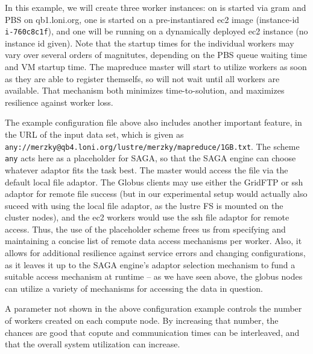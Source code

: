 \documentclass[conference,final]{IEEEtran}
\newcommand{\T}[1]{\texttt{#1}}
\begin{document}
  
  
  

 In this example, we will create three worker instances: on is started
 via gram and PBS on qb1.loni.org, one is started on a
 pre-instantiared ec2 image (instance-id \T{i-760c8c1f}), and one will
 be running on a dynamically deployed ec2 instance (no instance id
 given).  Note that the startup times for the individual workers may
 vary over several orders of magnitutes, depending on the PBS queue
 waiting time and VM startup time.  The mapreduce master will start to
 utilize workers as soon as they are able to register themselfs, so
 will not wait until all workers are available.  That mechanism both
 minimizes time-to-solution, and maximizes resilience against worker
 loss.

 The example configuration file above also includes another important
 feature, in the URL of the input data set, which is given as
 {\footnotesize
   \T{any://merzky@qb4.loni.org/lustre/merzky/mapreduce/1GB.txt}}.
 The scheme \T{any} acts here as a placeholder for SAGA, so that the
 SAGA engine can choose whatever adaptor fits the task best.  The
 master would access the file via the default local file adaptor.  The
 Globus clients may use either the GridFTP or ssh adaptor for remote
 file success (but in our experimental setup would actually also
 suceed with using the local file adaptor, as the lustre FS is mounted
 on the cluster nodes), and the ec2 workers would use the ssh file
 adaptor for remote access.  Thus, the use of the placeholder scheme
 frees us from specifying and maintaining a concise list of remote
 data access mechanisms per worker.  Also, it allows for additional
 resilience against service errors and changing configurations, as it
 leaves it up to the SAGA engine's adaptor selection mechanism to fund
 a suitable access mechanism at runtime -- as we have seen above, the
 globus nodes can utilize a variety of mechanisms for accessing the
 data in question.

 A parameter not shown in the above configuration example controls the
 number of workers created on each compute node.  By increasing that
 number, the chances are good that copute and communication times can
 be interleaved, and that the overall system utilization can increase.
 
\end{document}
